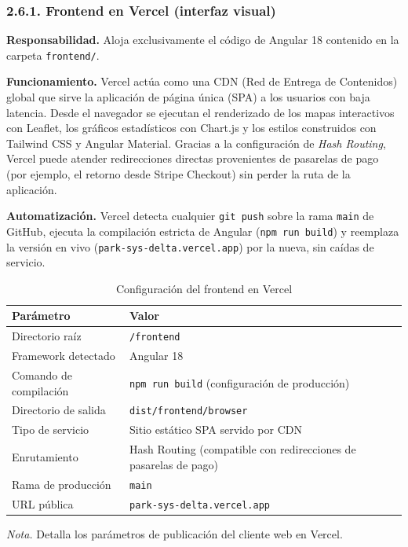 \clearpage\subsubsection{2.6.1. Frontend en Vercel (interfaz visual)}

\textbf{Responsabilidad.} Aloja exclusivamente el código de Angular 18 contenido en la carpeta \texttt{frontend/}.

\textbf{Funcionamiento.} Vercel actúa como una CDN (Red de Entrega de Contenidos) global que sirve la aplicación de página única (SPA) a los usuarios con baja latencia. Desde el navegador se ejecutan el renderizado de los mapas interactivos con Leaflet, los gráficos estadísticos con Chart.js y los estilos construidos con Tailwind CSS y Angular Material. Gracias a la configuración de \textit{Hash Routing}, Vercel puede atender redirecciones directas provenientes de pasarelas de pago (por ejemplo, el retorno desde Stripe Checkout) sin perder la ruta de la aplicación.

\textbf{Automatización.} Vercel detecta cualquier \texttt{git push} sobre la rama \texttt{main} de GitHub, ejecuta la compilación estricta de Angular (\texttt{npm run build}) y reemplaza la versión en vivo (\texttt{park-sys-delta.vercel.app}) por la nueva, sin caídas de servicio.

\begin{table}[htbp]
\caption{Configuración del frontend en Vercel}
\label{tab:config_vercel}
\begin{tabular}{@{}p{5cm} p{10cm}@{}}
\toprule
\textbf{Parámetro} & \textbf{Valor} \\
\midrule
Directorio raíz & \texttt{/frontend} \\
Framework detectado & Angular 18 \\
Comando de compilación & \texttt{npm run build} (configuración de producción) \\
Directorio de salida & \texttt{dist/frontend/browser} \\
Tipo de servicio & Sitio estático SPA servido por CDN \\
Enrutamiento & Hash Routing (compatible con redirecciones de pasarelas de pago) \\
Rama de producción & \texttt{main} \\
URL pública & \texttt{park-sys-delta.vercel.app} \\
\bottomrule
\end{tabular}
\par\vspace{0.2cm}
\textit{Nota.} Detalla los parámetros de publicación del cliente web en Vercel.
\end{table}

